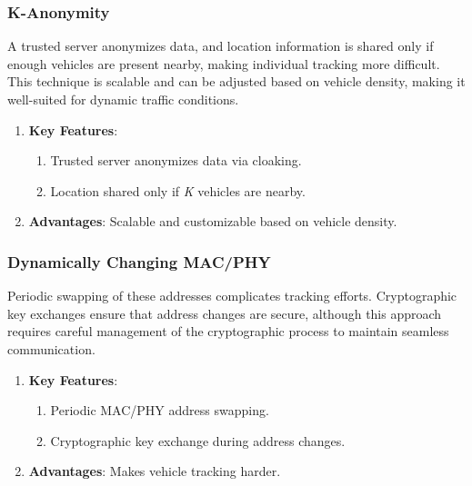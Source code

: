 \subsubsection{K-Anonymity}
A trusted server anonymizes data, and location information is shared only if enough vehicles are present nearby, making individual tracking more difficult.
This technique is scalable and can be adjusted based on vehicle density, making it well-suited for dynamic traffic conditions.
\begin{enumerate}
    \item \textbf{Key Features}:
    \begin{enumerate}
        \item Trusted server anonymizes data via cloaking.
        \item Location shared only if \emph{K} vehicles are nearby.
    \end{enumerate}
    \item \textbf{Advantages}: Scalable and customizable based on vehicle density.
\end{enumerate}

\subsubsection{Dynamically Changing MAC/PHY}
Periodic swapping of these addresses complicates tracking efforts.
Cryptographic key exchanges ensure that address changes are secure, although this approach requires careful management of the cryptographic process to maintain seamless communication.
\begin{enumerate}
    \item \textbf{Key Features}:
    \begin{enumerate}
        \item Periodic MAC/PHY address swapping.
        \item Cryptographic key exchange during address changes.
    \end{enumerate}
    \item \textbf{Advantages}: Makes vehicle tracking harder.
\end{enumerate}

